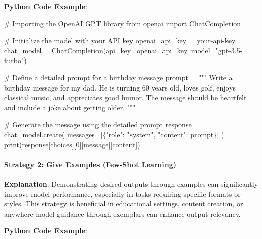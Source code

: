 \documentclass[
]{agujournal2019}
\let\oldparagraph\paragraph
\renewcommand{\paragraph}[1]{\oldparagraph{#1}\mbox{}}
\newenvironment{Shaded}{\begin{snugshade}}{\end{snugshade}}
\newcommand{\BuiltInTok}[1]{\textcolor[rgb]{0.00,0.23,0.31}{#1}}
\newcommand{\CommentTok}[1]{\textcolor[rgb]{0.37,0.37,0.37}{#1}}
\newcommand{\DecValTok}[1]{\textcolor[rgb]{0.68,0.00,0.00}{#1}}
\newcommand{\ImportTok}[1]{\textcolor[rgb]{0.00,0.46,0.62}{#1}}
\newcommand{\NormalTok}[1]{\textcolor[rgb]{0.00,0.23,0.31}{#1}}
\newcommand{\OperatorTok}[1]{\textcolor[rgb]{0.37,0.37,0.37}{#1}}
\newcommand{\StringTok}[1]{\textcolor[rgb]{0.13,0.47,0.30}{#1}}
\begin{document}
\textbf{Python Code Example}:

\begin{Shaded}
\begin{Highlighting}[]
\CommentTok{\# Importing the OpenAI GPT library}
\ImportTok{from}\NormalTok{ openai }\ImportTok{import}\NormalTok{ ChatCompletion}

\CommentTok{\# Initialize the model with your API key}
\NormalTok{openai\_api\_key }\OperatorTok{=} \StringTok{\textquotesingle{}your{-}api{-}key\textquotesingle{}}
\NormalTok{chat\_model }\OperatorTok{=}\NormalTok{ ChatCompletion(api\_key}\OperatorTok{=}\NormalTok{openai\_api\_key, model}\OperatorTok{=}\StringTok{"gpt{-}3.5{-}turbo"}\NormalTok{)}

\CommentTok{\# Define a detailed prompt for a birthday message}
\NormalTok{prompt }\OperatorTok{=} \StringTok{"""}
\StringTok{Write a birthday message for my dad. He is turning 60 years old, loves golf, enjoys classical music, and appreciates good humor. The message should be heartfelt and include a joke about getting older.}
\StringTok{"""}

\CommentTok{\# Generate the message using the detailed prompt}
\NormalTok{response }\OperatorTok{=}\NormalTok{ chat\_model.create(}
\NormalTok{    messages}\OperatorTok{=}\NormalTok{[\{}\StringTok{"role"}\NormalTok{: }\StringTok{"system"}\NormalTok{, }\StringTok{"content"}\NormalTok{: prompt\}]}
\NormalTok{)}
\BuiltInTok{print}\NormalTok{(response[}\StringTok{\textquotesingle{}choices\textquotesingle{}}\NormalTok{][}\DecValTok{0}\NormalTok{][}\StringTok{\textquotesingle{}message\textquotesingle{}}\NormalTok{][}\StringTok{\textquotesingle{}content\textquotesingle{}}\NormalTok{])}
\end{Highlighting}
\end{Shaded}

\paragraph{Strategy 2: Give Examples (Few-Shot
Learning)}\label{strategy-2-give-examples-few-shot-learning}

\textbf{Explanation}: Demonstrating desired outputs through examples can
significantly improve model performance, especially in tasks requiring
specific formats or styles. This strategy is beneficial in educational
settings, content creation, or anywhere model guidance through exemplars
can enhance output relevancy.

\textbf{Python Code Example}:
\end{document}
